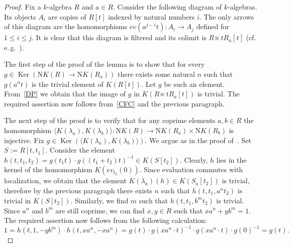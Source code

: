 \documentclass[oneside, 11pt]{amsart}
\numberwithin{equation}{section}
\newcommand{\Ker}{\mathop{\mathrm{Ker}}\nolimits}
\theoremstyle{definition}
\theoremstyle{definition}
\theoremstyle{remark}
\begin{document}
\begin{proof}
 Fix a $k$-algebra $R$ and $a \in R$. 
 Consider the following diagram of $k$-algebras. Its objects $A_i$ are copies of $R[t]$ indexed by natural numbers $i$. The only arrows of this diagram are the homomorphisms $ev (a^{j-i}t)\colon A_i \to A_j$ defined for $1 \leq i \leq j$. It is clear that this diagram is filtered and its colimit is $R \ltimes tR_a[t]$ (cf. e.\,g.~\cite[Lemma~15]{S15}). 
 
 The first step of the proof of the lemma is to show that for every $g \in \Ker(\mathrm NK(R) \to \mathrm NK(R_a))$ there exists some natural $n$ such that $g(a^nt)$ is the trivial element of $K(R[t])$. Let $g$ be such an element. From~\ref{DP} we obtain that the image of $g$ in $K(R \ltimes tR_a[t])$ is trivial. The required assertion now follows from~\ref{CFC} and the previous paragraph.
 
 The next step of the proof is to verify that for any coprime elements $a, b \in R$ the homomorphism $\langle K(\lambda_a), K(\lambda_b) \rangle \colon \mathrm NK(R) \to \mathrm NK(R_a) \times \mathrm NK(R_b)$ is injective. Fix $g \in \Ker(\langle K(\lambda_a), K(\lambda_b) \rangle)$. We argue as in the proof of~\cite[Lemma~2.5]{Tu83}. Set $S := R[t, t_1]$. Consider the element $h(t, t_1, t_2) = g(t_1 t) \cdot g((t_1 + t_2)t)^{-1}\in K(S[t_2]).$ Clearly, $h$ lies in the kernel of the homomorphism $K(ev_{t_2}(0))$. Since evaluation commutes with localization, we obtain that the element $K(\lambda_a)(h) \in K(S_a[t_2])$ is trivial, therefore by the previous paragraph there exists $n$ such that $h(t, t_1, a^nt_2)$ is trivial in $K(S[t_2])$. Similarly, we find $m$ such that $h(t, t_1, b^m t_2)$ is trivial. Since $a^n$ and $b^m$ are still coprime, we can find $x, y \in R$ such that $xa^n + yb^m = 1$. The required assertion now follows from the following calculation:
 $$1 = h(t, 1, -yb^m) \cdot h(t, xa^n, -xa^n) = g(t)\cdot g(xa^n\cdot t)^{-1} \cdot g(xa^n\cdot t) \cdot g(0)^{-1} = g(t).$$
 

\end{proof}
\end{document}
